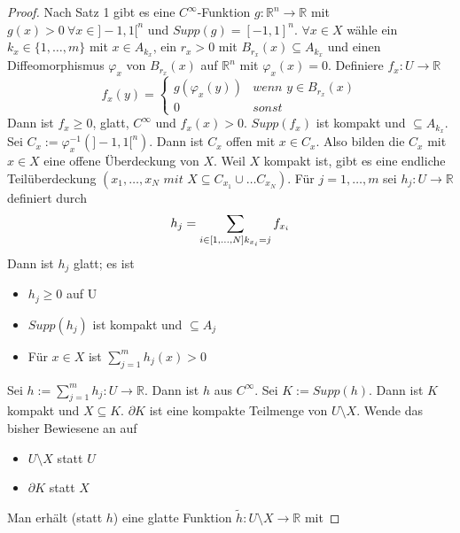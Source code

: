 \documentclass[10pt,a4paper]{report}
\begin{document}
\begin{proof}
  Nach Satz 1 gibt es eine $C^{\infty}$-Funktion $g : \mathbb{R}^{n} \rightarrow \mathbb{R}$ mit $g(x) > 0\ \forall x \in ]-1, 1[^{n}$ und $Supp(g) = [-1, 1]^{n}$.
  $\forall x \in X$ wähle ein $k_{x} \in \{ 1, \dots, m \}$ mit $x \in A_{k_{x}}$, ein $r_{x} > 0$ mit $B_{r_{x}}(x) \subseteq A_{k_{x}}$ und einen Diffeomorphismus $\varphi_{x}$ von $B_{r_{x}}(x)$ auf $\mathbb{R}^{n}$ mit $\varphi_{x}(x) = 0$.
  Definiere $f_{x} : U \rightarrow \mathbb{R}$
  \begin{equation}
    f_{x}(y) = \begin{cases}
      g(\varphi_{x}(y)) & \textit{wenn $y \in B_{r_{x}}(x)$}\\
      0 & \textit{sonst}
    \end{cases}
  \end{equation}
  Dann ist $f_{x} \ge 0$, glatt, $C^{\infty}$ und $f_{x}(x) > 0$.
  $Supp(f_{x})$ ist kompakt und $\subseteq A_{k_{x}}$.
  Sei $C_{x} := \varphi_{x}^{-1}(]-1, 1[^{n})$.
  Dann ist $C_{x}$ offen mit $x \in C_{x}$.
  Also bilden die $C_{x}$ mit $x \in X$ eine offene Überdeckung von $X$.
  Weil $X$ kompakt ist, gibt es eine endliche Teilüberdeckung $(x_{1}, \dots, x_{N}\textit{ mit }X \subseteq C_{x_{1}} \cup \dots C_{x_{N}})$.
  Für $j = 1, \dots, m$ sei $h_{j} : U \rightarrow \mathbb{R}$ definiert durch
  \begin{equation}
    h_{j} = \sum_{i \in [1, \dots, N]\\k_{x_{i}} = j} f_{x_{i}}
  \end{equation}
  Dann ist $h_{j}$ glatt; es ist
  \begin{itemize}
  \item $h_{j} \ge 0$ auf U
  \item $Supp(h_{j})$ ist kompakt und $\subseteq A_{j}$
  \item Für $x \in X$ ist $\sum_{j = 1}^{m} h_{j}(x) > 0$
  \end{itemize}
  Sei $h := \sum_{j = 1}^{m} h_{j} : U \rightarrow \mathbb{R}$.
  Dann ist $h$ aus $C^{\infty}$.
  Sei $K := Supp(h)$.
  Dann ist $K$ kompakt und $X \subseteq K$.
  $\partial K$ ist eine kompakte Teilmenge von $U \setminus X$.
  Wende das bisher Bewiesene an auf
  \begin{itemize}
  \item $U \setminus X$ statt $U$
  \item $\partial K$ statt $X$
  \end{itemize}
  Man erhält (statt $h$) eine glatte Funktion $\tilde{h} : U \setminus X \rightarrow \mathbb{R}$ mit

\end{proof}
\end{document}
